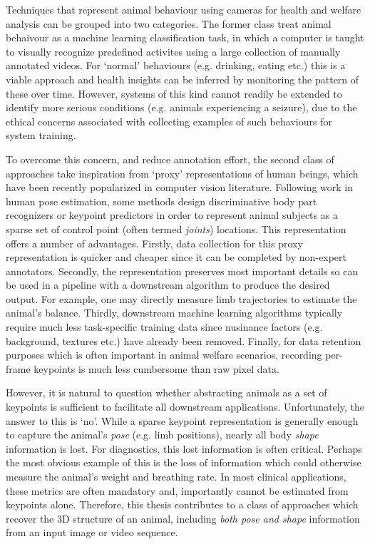 Techniques that represent animal behaviour using cameras for health and welfare analysis can be grouped into two categories. The former class treat animal behaivour as a machine learning classification task, in which a computer is taught to visually recognize predefined activites using a large collection of manually annotated videos. For `normal' behaviours (e.g. drinking, eating etc.) this is a viable approach and health insights can be inferred by monitoring the pattern of these over time. However, systems of this kind cannot readily be extended to identify more serious conditions (e.g. animals experiencing a seizure), due to the ethical concerns associated with collecting examples of such behaviours for system training. 

To overcome this concern, and reduce annotation effort, the second class of approaches take inspiration from `proxy' representations of human beings, which have been recently popularized in computer vision literature. Following work in human pose estimation, some methods design discriminative body part recognizers or keypoint predictors in order to represent animal subjects as a sparse set of control point (often termed \emph{joints}) locations. This representation offers a number of advantages. Firstly, data collection for this proxy representation is quicker and cheaper since it can be completed by non-expert annotators. Secondly, the representation preserves most important details so can be used in a pipeline with a downstream algorithm to produce the desired output. For example, one may directly measure limb trajectories to estimate the animal's balance. Thirdly, downstream machine learning algorithms typically require much less task-specific training data since nusinance factors (e.g. background, textures etc.) have already been removed. Finally, for data retention purposes which is often important in animal welfare scenarios, recording per-frame keypoints is much less cumbersome than raw pixel data.

However, it is natural to question whether abstracting animals as a set of keypoints is sufficient to facilitate all downstream applications. Unfortunately, the answer to this is `no'. While a sparse keypoint representation is generally enough to capture the animal's \emph{pose} (e.g. limb positions), nearly all body \emph{shape} information is lost. For diagnostics, this lost information is often critical. Perhaps the most obvious example of this is the loss of information which could otherwise measure the animal's weight and breathing rate. In most clinical applications, these metrics are often mandatory and, importantly cannot be estimated from keypoints alone. Therefore, this thesis contributes to a class of approaches which recover the 3D structure of an animal, including \emph{both pose and shape} information from an input image or video sequence.


